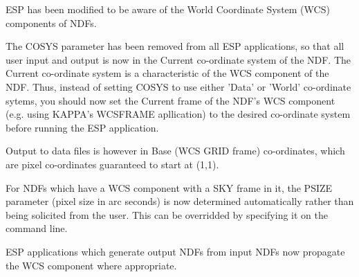 \documentclass[twoside,11pt]{article}
\newcommand{\htmladdnormallink}[2]{#1}
\newcommand{\xref}[3]{#1}
\newcommand{\xlabel}[1]{}
\begin{document}
ESP has been modified to be aware of the World Coordinate 
System (WCS) components of NDFs.

The COSYS parameter has been removed from all ESP applications, 
so that all user input and output is now in the Current 
co-ordinate system of the NDF.  The Current co-ordinate system 
is a characteristic of the WCS component of the NDF.  
Thus, instead of setting COSYS to use either 'Data' or 'World'
co-ordinate sytems, you should now set the Current frame of the 
NDF's WCS component (e.g. using KAPPA's WCSFRAME apllication) 
to the desired co-ordinate system before running the ESP 
application.

Output to data files is however in Base (WCS GRID frame) 
co-ordinates, which are pixel co-ordinates guaranteed to start 
at (1,1).

For NDFs which have a WCS component with a SKY frame in it, the
PSIZE parameter (pixel size in arc seconds) is now determined 
automatically rather than being solicited from the user.
This can be overridded by specifying it on the command line.

ESP applications which generate output NDFs from input NDFs now
propagate the WCS component where appropriate.





%

%
%
\end{document}
